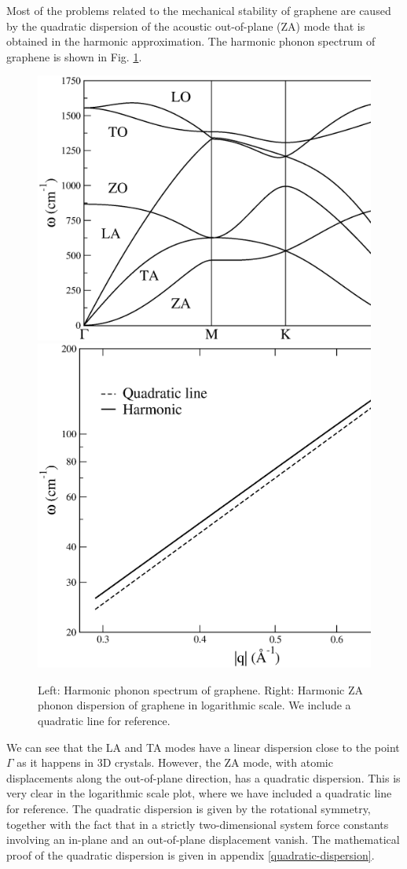 Most of the problems related to the mechanical stability of graphene are caused by the quadratic dispersion of the 
acoustic out-of-plane (ZA) mode that is obtained in the harmonic approximation. The harmonic phonon spectrum of 
graphene is shown in Fig. \ref{harmonic-graphene}.
\begin{figure}[h]
\includegraphics[width=0.55\linewidth]{Figures/harmonic-graphene.eps}
\includegraphics[width=0.45\linewidth]{Figures/harmonic-graphene-logarithmic.eps}
\caption[Graphene harmonic phonons]{Left: Harmonic phonon spectrum of graphene. Right: Harmonic ZA phonon dispersion 
	of graphene in logarithmic scale. We include a quadratic line for reference.}
\label{harmonic-graphene}
\end{figure}
We can see that the LA and TA modes have a linear dispersion close to the point $\Gamma$ as it happens in 3D 
crystals. However, the ZA mode, with atomic displacements along the out-of-plane direction, has a 
quadratic dispersion. This is very clear in the logarithmic scale plot, where we have included a quadratic line for 
reference. The quadratic dispersion is given by the rotational symmetry, together with the fact that in a strictly 
two-dimensional system force constants involving an in-plane and an out-of-plane displacement 
vanish\cite{katsnelson2013graphene}. The mathematical proof of the quadratic dispersion is given in 
appendix \ref{quadratic-dispersion}. \\

